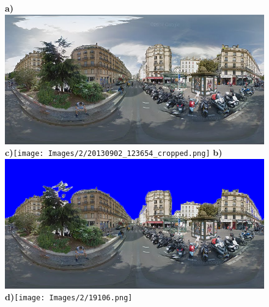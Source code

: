 \documentclass{article}
\begin{document}
\begin{figure}
\centering    
\textbf{\scriptsize{a)}}\includegraphics[scale=0.25]{Images/2/panorama-JtVHmEl7WCiz1xJ0bcJpBg-1.png} 
\textbf{\scriptsize{c)}}\texttt{[image: Images/2/20130902\_123654\_cropped.png]} 
\textbf{\scriptsize{b)}}\includegraphics[scale=0.25]{Images/2/panorama-JtVHmEl7WCiz1xJ0bcJpBg-1-marked.png} 
\textbf{\scriptsize{d)}}\texttt{[image: Images/2/19106.png]} 
 \label{fig:origmarked}  
\end{figure} 



\clearpage %
\end{document}
